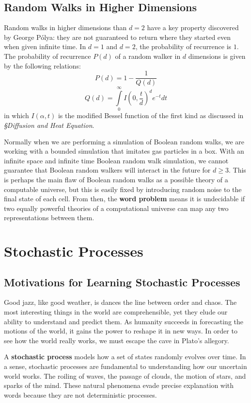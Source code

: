 \documentclass[10pt, a5paper, twoside, openright]{memoir}
\begin{document}
\section{Random Walks in Higher Dimensions}
Random walks in higher dimensions than $d=2$ have a key property discovered by George P\'{o}lya: they are not guaranteed to return where they started even when given infinite time. In $d=1$ and $d=2$, the probability of recurrence is $1$. The probability of recurrence $P(d)$ of a random walker in $d$ dimensions is given by the following relations:
$$P(d) = 1 - \frac{1}{Q(d)}$$
$$Q(d) = \int\limits_0^\infty I(0, \frac{t}{d})^d e^{-t} dt$$
in which $I(\alpha, t)$ is the modified Bessel function of the first kind as discussed in \textit{\S Diffusion and Heat Equation}.

Normally when we are performing a simulation of Boolean random walks, we are working with a bounded simulation that imitates gas particles in a box. With an infinite space and infinite time Boolean random walk simulation, we cannot guarantee that Boolean random walkers will interact in the future for $d \geq 3$. This is perhaps the main flaw of Boolean random walks as a possible theory of a computable universe, but this is easily fixed by introducing random noise to the final state of each cell. From then, the \textbf{word problem} means it is undecidable if two equally powerful theories of a computational universe can map any two representations between them.

\chapter{Stochastic Processes}
\section{Motivations for Learning Stochastic Processes}
Good jazz, like good weather, is dances the line between order and chaos. The most interesting things in the world are comprehensible, yet they elude our ability to understand and predict them. As humanity succeeds in forecasting the motions of the world, it gains the power to reshape it in new ways. In order to see how the world really works, we must escape the cave in Plato's allegory.

A \textbf{stochastic process} models how a set of states randomly evolves over time. In a sense, stochastic processes are fundamental to understanding how our uncertain world works. The roiling of waves, the passage of clouds, the motion of stars, and sparks of the mind. These natural phenomena evade precise explanation with words because they are not deterministic processes. 
\end{document}
